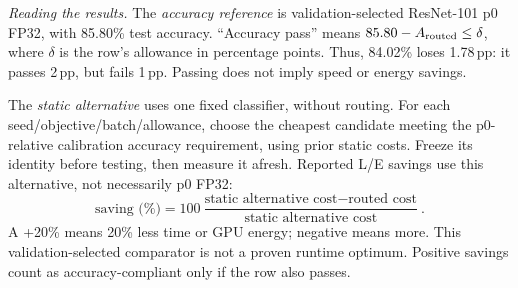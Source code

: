 \documentclass[10pt,a4paper]{article}
\newcommand{\pp}{\,pp}
\begin{document}
\textit{Reading the results.} The \emph{accuracy reference} is validation-selected ResNet-101 p0 FP32, with 85.80\% test accuracy. ``Accuracy pass'' means $85.80-A_{\rm routed}\leq\delta$, where $\delta$ is the row's allowance in percentage points. Thus, 84.02\% loses 1.78\pp: it passes 2\pp, but fails 1\pp. Passing does not imply speed or energy savings.

The \emph{static alternative} uses one fixed classifier, without routing. For each seed/objective/batch/allowance, choose the cheapest candidate meeting the p0-relative calibration accuracy requirement, using prior static costs. Freeze its identity before testing, then measure it afresh. Reported L/E savings use this alternative, not necessarily p0 FP32:
\[
\text{saving (\%)}=100\frac{\text{static alternative cost}-\text{routed cost}}{\text{static alternative cost}}.
\]
A +20\% means 20\% less time or GPU energy; negative means more. This validation-selected comparator is not a proven runtime optimum. Positive savings count as accuracy-compliant only if the row also passes.
\end{document}
